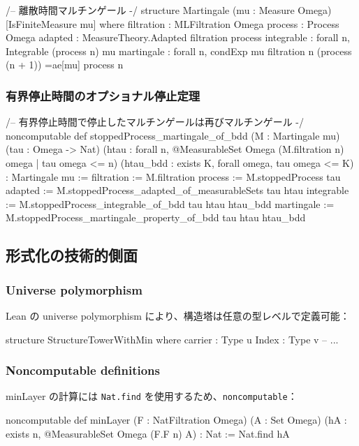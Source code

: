 \documentclass[11pt,a4paper]{article}
\theoremstyle{plain}
\theoremstyle{definition}
\begin{document}
\begin{leancode}
/-- 離散時間マルチンゲール -/
structure Martingale (mu : Measure Omega) [IsFiniteMeasure mu] where
  filtration : MLFiltration Omega
  process : Process Omega
  adapted : MeasureTheory.Adapted filtration process
  integrable : forall n, Integrable (process n) mu
  martingale : forall n, condExp mu filtration n (process (n + 1)) =ae[mu] process n
\end{leancode}

\subsubsection{有界停止時間のオプショナル停止定理}

\begin{leancode}
/-- 有界停止時間で停止したマルチンゲールは再びマルチンゲール -/
noncomputable def stoppedProcess_martingale_of_bdd
    (M : Martingale mu)
    (tau : Omega -> Nat)
    (htau : forall n, @MeasurableSet Omega (M.filtration n) {omega | tau omega <= n})
    (htau_bdd : exists K, forall omega, tau omega <= K) :
  Martingale mu :=
{ filtration := M.filtration
  process := M.stoppedProcess tau
  adapted := M.stoppedProcess_adapted_of_measurableSets tau htau
  integrable := M.stoppedProcess_integrable_of_bdd tau htau htau_bdd
  martingale := M.stoppedProcess_martingale_property_of_bdd tau htau htau_bdd }
\end{leancode}

\subsection{形式化の技術的側面}

\subsubsection{Universe polymorphism}

Lean の universe polymorphism により、構造塔は任意の型レベルで定義可能：
\begin{leancode}
structure StructureTowerWithMin where
  carrier : Type u
  Index : Type v
  -- ...
\end{leancode}

\subsubsection{Noncomputable definitions}

minLayer の計算には \texttt{Nat.find} を使用するため、\texttt{noncomputable}：
\begin{leancode}
noncomputable def minLayer (F : NatFiltration Omega) (A : Set Omega)
    (hA : exists n, @MeasurableSet Omega (F.F n) A) : Nat :=
  Nat.find hA
\end{leancode}
\end{document}
